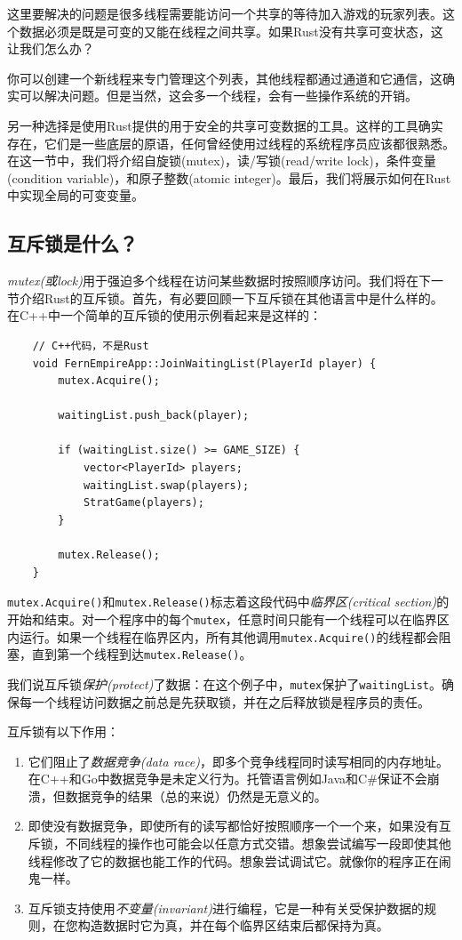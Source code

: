 这里要解决的问题是很多线程需要能访问一个共享的等待加入游戏的玩家列表。这个数据必须是既是可变的又能在线程之间共享。如果Rust没有共享可变状态，这让我们怎么办？

你可以创建一个新线程来专门管理这个列表，其他线程都通过通道和它通信，这确实可以解决问题。但是当然，这会多一个线程，会有一些操作系统的开销。

另一种选择是使用Rust提供的用于安全的共享可变数据的工具。这样的工具确实存在，它们是一些底层的原语，任何曾经使用过线程的系统程序员应该都很熟悉。在这一节中，我们将介绍自旋锁(mutex)，读/写锁(read/write lock)，条件变量(condition variable)，和原子整数(atomic integer)。最后，我们将展示如何在Rust中实现全局的可变变量。

\subsection{互斥锁是什么？}

\emph{mutex(或lock)}用于强迫多个线程在访问某些数据时按照顺序访问。我们将在下一节介绍Rust的互斥锁。首先，有必要回顾一下互斥锁在其他语言中是什么样的。在C++中一个简单的互斥锁的使用示例看起来是这样的：
\begin{verbatim}
    // C++代码，不是Rust
    void FernEmpireApp::JoinWaitingList(PlayerId player) {
        mutex.Acquire();

        waitingList.push_back(player);

        if (waitingList.size() >= GAME_SIZE) {
            vector<PlayerId> players;
            waitingList.swap(players);
            StratGame(players);
        }

        mutex.Release();
    }
\end{verbatim}

\texttt{mutex.Acquire()}和\texttt{mutex.Release()}标志着这段代码中\emph{临界区(critical section)}的开始和结束。对一个程序中的每个\texttt{mutex}，任意时间只能有一个线程可以在临界区内运行。如果一个线程在临界区内，所有其他调用\texttt{mutex.Acquire()}的线程都会阻塞，直到第一个线程到达\texttt{mutex.Release()}。

我们说互斥锁\emph{保护(protect)}了数据：在这个例子中，\texttt{mutex}保护了\texttt{waitingList}。确保每一个线程访问数据之前总是先获取锁，并在之后释放锁是程序员的责任。

互斥锁有以下作用：
\begin{enumerate}
    \item 它们阻止了\emph{数据竞争(data race)}，即多个竞争线程同时读写相同的内存地址。在C++和Go中数据竞争是未定义行为。托管语言例如Java和C\#保证不会崩溃，但数据竞争的结果（总的来说）仍然是无意义的。
    \item 即使没有数据竞争，即使所有的读写都恰好按照顺序一个一个来，如果没有互斥锁，不同线程的操作也可能会以任意方式交错。想象尝试编写一段即使其他线程修改了它的数据也能工作的代码。想象尝试调试它。就像你的程序正在闹鬼一样。
    \item 互斥锁支持使用\emph{不变量(invariant)}进行编程，它是一种有关受保护数据的规则，在您构造数据时它为真，并在每个临界区结束后都保持为真。 
\end{enumerate}

